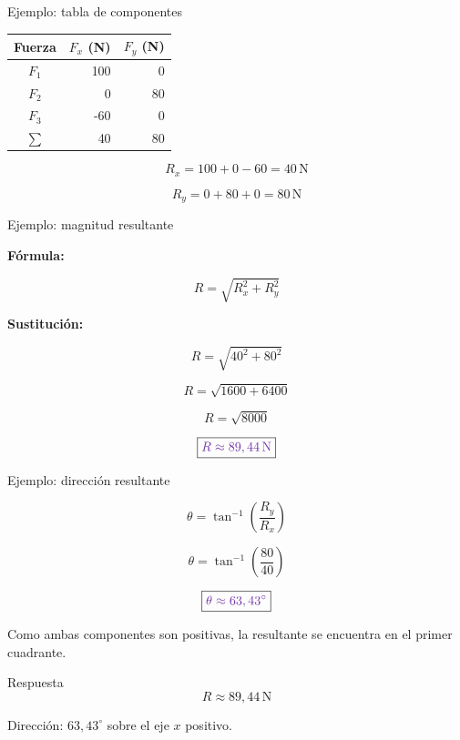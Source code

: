 \documentclass[aspectratio=169,11pt]{beamer}
\newcommand{\resp}[1]{
 \[
 \boxed{\color{morado}{#1}}
 \]
}
\begin{document}
\begin{frame}{Ejemplo: tabla de componentes}

\begin{center}
\renewcommand{\arraystretch}{1.6}

\begin{tabular}{|c|r|r|}
\hline
Fuerza & \(F_x\) (N) & \(F_y\) (N)\\
\hline
\(F_1\) & 100 & 0\\
\hline
\(F_2\) & 0 & 80\\
\hline
\(F_3\) & -60 & 0\\
\hline
\(\sum\) & 40 & 80\\
\hline
\end{tabular}
\end{center}

\[
R_x=100+0-60=40\,\mathrm{N}
\]

\[
R_y=0+80+0=80\,\mathrm{N}
\]

\end{frame}

\begin{frame}{Ejemplo: magnitud resultante}

\textbf{Fórmula:}

\[
R=\sqrt{R_x^2+R_y^2}
\]

\textbf{Sustitución:}

\[
R=\sqrt{40^2+80^2}
\]

\[
R=\sqrt{1600+6400}
\]

\[
R=\sqrt{8000}
\]

\resp{R\approx89,44\,\mathrm{N}}

\end{frame}

\begin{frame}{Ejemplo: dirección resultante}

\[
\theta=\tan^{-1}\left(\frac{R_y}{R_x}\right)
\]

\[
\theta=\tan^{-1}\left(\frac{80}{40}\right)
\]

\resp{\theta\approx63,43^\circ}

Como ambas componentes son
positivas, la resultante se
encuentra en el primer cuadrante.

\begin{block}{Respuesta}
\[
\boxed{
R\approx89,44\,\mathrm{N}
}
\]

Dirección: \(63,43^\circ\)
sobre el eje \(x\) positivo.
\end{block}

\end{frame}
\end{document}
